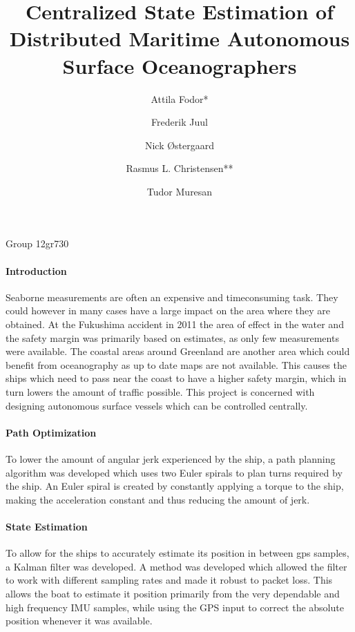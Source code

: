 \documentclass{memoir}
\begin{document}
\title{Centralized State Estimation of Distributed Maritime Autonomous Surface Oceanographers}
\author{Attila Fodor* \and Frederik Juul \and Nick \O stergaard \and Rasmus L. Christensen** \and Tudor Muresan}
\maketitle
\begin{center}
\vspace{-0.7cm}
Group 12gr730
\end{center}
\thispagestyle{empty}
\paragraph{Introduction}
Seaborne measurements are often an expensive and timeconsuming task. They could however in many cases have a large impact on the area where they are obtained. At the Fukushima accident in 2011 the area of effect in the water and the safety margin was primarily based on estimates, as only few measurements were available. The coastal areas around Greenland are another area which could benefit from oceanography as up to date maps are not available. This causes the ships which need to pass near the coast to have a higher safety margin, which in turn lowers the amount of traffic possible. This project is concerned with designing autonomous surface vessels which can be controlled centrally. 

\paragraph{Path Optimization}
To lower the amount of angular jerk experienced by the ship, a path planning algorithm was developed which uses two Euler spirals to plan turns required by the ship. An Euler spiral is created by constantly applying a torque to the ship, making the acceleration constant and thus reducing the amount of jerk. 

\paragraph{State Estimation}
To allow for the ships to accurately estimate its position in between gps samples, a Kalman filter was developed. A method was developed which allowed the filter to work with different sampling rates and made it robust to packet loss. This allows the boat to estimate it position primarily from the very dependable and high frequency IMU samples, while using the GPS input to correct the absolute position whenever it was available.
\end{document}
